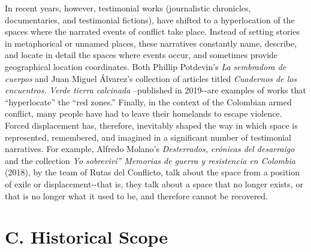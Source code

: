 \documentclass[
  11pt,
,
onecolumn,
openany
]{book}
\begin{document}
In recent years, however, testimonial works (journalistic chronicles,
documentaries, and testimonial fictions), have shifted to a hyperlocation of
the spaces where the narrated events of conflict take place. Instead of
setting stories in metaphorical or unnamed places, these narratives constantly
name, describe, and locate in detail the spaces where events occur, and
sometimes provide geographical location coordinates. Both Phillip Potdevin's
\emph{La sembradora de cuerpos} and Juan Miguel Álvarez's collection of
articles titled \emph{Cuadernos de los encuentros. Verde tierra calcinada}
--published in 2019-\/-are examples of works that ``hyperlocate'' the ``red
zones.'' Finally, in the context of the Colombian armed conflict, many people
have had to leave their homelands to escape violence. Forced displacement has,
therefore, inevitably shaped the way in which space is represented,
remembered, and imagined in a significant number of testimonial narratives.
For example, Alfredo Molano's \emph{Desterrados, crónicas del desarraigo} and
the collection \emph{Yo sobreviví'' Memorias de guerra y resistencia en
Colombia} (2018), by the team of Rutas del Conflicto, talk about the space
from a position of exile or displacement-\/-that is, they talk about a space
that no longer exists, or that is no longer what it used to be, and therefore
cannot be recovered.

\hypertarget{c.-historical-scope}{%
\section{C. Historical Scope}\label{c.-historical-scope}}
\end{document}
